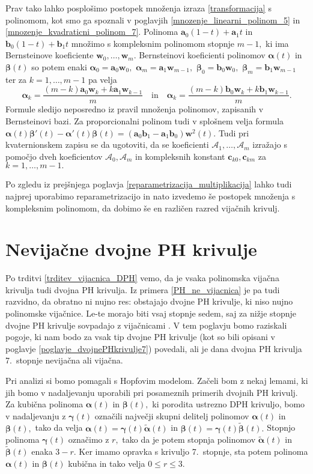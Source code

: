 \documentclass[12pt,a4paper,twoside]{article}
\theoremstyle{definition} %
\theoremstyle{plain} %
\numberwithin{equation}{section}  %
\newcommand{\aV}{\mathbf{a}}
\newcommand{\bV}{\mathbf{b}}
\newcommand{\cV}{\mathbf{c}}
\newcommand{\wV}{\mathbf{w}}
\newcommand{\AQ}{\mathcal{A}}
\newcommand{\balpha}{\boldsymbol \alpha}
\newcommand{\bbeta}{\boldsymbol \beta}
\newcommand{\bgamma}{\boldsymbol \gamma}
\newcommand{\btalpha}{\tilde{\boldsymbol \alpha}}
\newcommand{\btbeta}{\tilde{\boldsymbol \beta}}
\begin{document}
Prav tako lahko posplošimo postopek množenja izraza \eqref{transformacija} s polinomom, kot smo ga spoznali v poglavjih \ref{mnozenje_linearni_polinom_5} in \ref{mnozenje_kvadraticni_polinom_7}. Polinoma $\aV_0(1-t)+\aV_1t$ in $\bV_0(1-t)+\bV_1t$ množimo s kompleksnim polinomom stopnje $m-1,$ ki ima Bernsteinove koeficiente $\wV_0,\dots,\wV_m.$ Bernsteinovi koeficienti polinomov $\balpha(t)$ in $\bbeta(t)$ so potem enaki $\balpha_0=\aV_0\wV_0,$ $\balpha_m=\aV_1\wV_{m-1},$ $\bbeta_0=\bV_0\wV_0,$ $\bbeta_m=\bV_1\wV_{m-1}$ ter za $k=1,\dots,m-1$ pa velja
\begin{equation*}
	\balpha_k=\frac{(m-k)\aV_0\wV_k+k\aV_1\wV_{k-1}}{m}\quad\text{in}\quad\balpha_k=\frac{(m-k)\bV_0\wV_k+k\bV_1\wV_{k-1}}{m}.
\end{equation*}
Formule sledijo neposredno iz pravil množenja polinomov, zapisanih v Bernsteinovi bazi. Za proporcionalni polinom tudi v splošnem velja formula $\balpha(t)\bbeta'(t)-\balpha'(t)\bbeta(t)=(\aV_0\bV_1-\aV_1\bV_0)\wV^2(t).$ Tudi pri kvaternionskem zapisu se da ugotoviti, da se koeficienti $\AQ_1,\dots,\AQ_m$ izražajo s pomočjo dveh koeficientov $\AQ_0,\AQ_m$ in kompleksnih konstant $\cV_{k0},\cV_{km}$ za $k=1,\dots,m-1.$

Po zgledu iz prejšnjega poglavja \ref{reparametrizacija_multiplikacija} lahko tudi najprej uporabimo reparametrizacijo in nato izvedemo še postopek množenja s kompleksnim polinomom, da dobimo še en različen razred vijačnih krivulj.


\section{Nevijačne dvojne PH krivulje}

Po trditvi \ref{trditev_vijacnica_DPH} vemo, da je vsaka polinomska vijačna krivulja tudi dvojna PH krivulja. Iz primera \ref{PH_ne_vijacnica} je pa tudi razvidno, da obratno ni nujno res: obstajajo dvojne PH krivulje, ki niso nujno polinomske vijačnice. Le-te morajo biti vsaj stopnje sedem, saj za nižje stopnje dvojne PH krivulje sovpadajo z vijačnicami \cite[Izrek 1, str.\ 121]{beltranmonterde}. V tem poglavju bomo raziskali pogoje, ki nam bodo za vsak tip dvojne PH krivulje (kot so bili opisani v poglavje \ref{poglavje_dvojnePHkrivulje7}) povedali, ali je dana dvojna PH krivulja 7.\ stopnje nevijačna ali vijačna.

Pri analizi si bomo pomagali s Hopfovim modelom. Začeli bom z nekaj lemami, ki jih bomo v nadaljevanju uporabili pri posameznih primerih dvojnih PH krivulj. Za kubična polinoma $\balpha(t)$ in $\bbeta(t),$ ki porodita ustrezno DPH krivuljo, bomo v nadaljevanju z $\bgamma(t)$ označili največji skupni delitelj polinomov $\balpha(t)$ in $\bbeta(t),$ tako da velja $\balpha(t)=\bgamma(t)\btalpha(t)$ in $\bbeta(t)=\bgamma(t)\btbeta(t).$ Stopnjo polinoma $\bgamma(t)$ označimo z $r,$ tako da je potem stopnja polinomov $\btalpha(t)$ in $\btbeta(t)$ enaka $3-r.$ Ker imamo opravka s krivuljo 7.\ stopnje, sta potem polinoma $\balpha(t)$ in $\bbeta(t)$ kubična in tako velja $0\leq r \leq 3.$
\end{document}
